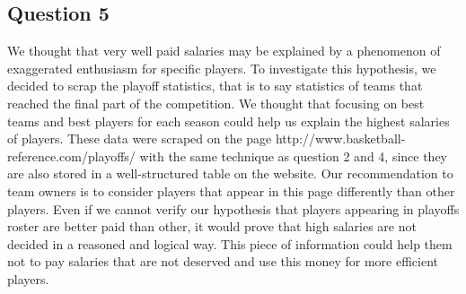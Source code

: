 \subsection{Question 5}
\label{subsec:315}
We thought that very well paid salaries may be explained by a phenomenon of exaggerated enthusiasm for specific players. To investigate this hypothesis, we decided to scrap the playoff statistics, that is to say statistics of teams that reached the final part of the competition. We thought that focusing on best teams and best players for each season could help us explain the highest salaries of players. These data were scraped on the page http://www.basketball-reference.com/playoffs/ with the same technique as question 2 and 4, since they are also stored in a well-structured table on the website. Our recommendation to team owners is to consider players that appear in this page differently than other players. Even if we cannot verify our hypothesis that players appearing in playoffs roster are better paid than other, it would prove that high salaries are not decided in a reasoned and logical way. This piece of information could help them not to pay salaries that are not deserved and use this money for more efficient players.